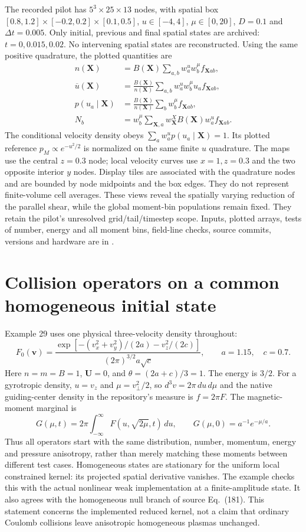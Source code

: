 \documentclass[11pt,letterpaper]{article}
\newcommand{\X}{\mathbf X}
\begin{document}
The recorded pilot has $5^3\times25\times13$ nodes, with spatial box
$[0.8,1.2]\times[-0.2,0.2]\times[0.1,0.5]$, $u\in[-4,4]$,
$\mu\in[0,20]$, $D=0.1$ and $\Delta t=0.005$. Only initial, previous and
final spatial states are archived: $t=0,0.015,0.02$. No intervening spatial
states are reconstructed. Using the same positive quadrature, the plotted
quantities are
\begin{align*}
 n(\X)&=B(\X)\sum_{a,b}w^u_a w^\mu_b f_{\X ab},\\
 \overline u(\X)&=\frac{B(\X)}{n(\X)}
        \sum_{a,b}w^u_a w^\mu_b u_a f_{\X ab},\\
 p(u_a\mid\X)&=\frac{B(\X)}{n(\X)}
        \sum_b w^\mu_b f_{\X ab},\\
 N_b&=w^\mu_b\sum_{\X,a}w^X_{\X}B(\X)w^u_a f_{\X ab}.
\end{align*}
The conditional velocity density obeys $\sum_a w^u_a p(u_a\mid\X)=1$.
Its plotted reference $p_M\propto e^{-u^2/2}$ is normalized on the same
finite $u$ quadrature. The maps use the central $z=0.3$ node; local velocity
curves use $x=1,z=0.3$ and the two opposite interior $y$ nodes. Display tiles
are associated with the quadrature nodes and are bounded by node midpoints
and the box edges. They do not represent finite-volume cell averages.
These views reveal the spatially varying reduction of the parallel shear,
while the global moment-bin populations remain fixed. They retain the
pilot's unresolved grid/tail/timestep scope. Inputs, plotted arrays, tests
of number, energy and all moment bins, field-line checks, source commits,
versions and hardware are in .

\section{Collision operators on a common homogeneous initial state}
\label{sec:commonoperators}
Example 29 uses one physical three-velocity density throughout:
\[
 F_0(\mathbf v)=\frac{\exp[-(v_x^2+v_y^2)/(2a)-v_z^2/(2c)]}
 {(2\pi)^{3/2}a\sqrt c},\qquad a=1.15,\quad c=0.7.
\]
Here $n=m=B=1$, $\mathbf U=0$, and $\theta=(2a+c)/3=1$.
The energy is $3/2$. For a gyrotropic density, $u=v_z$ and
$\mu=v_\perp^2/2$, so $d^3v=2\pi\,du\,d\mu$ and the native
guiding-center density in the repository's measure is $f=2\pi F$.
The magnetic-moment marginal is
\[
 G(\mu,t)=2\pi\int_{-\infty}^{\infty}F(u,\sqrt{2\mu},t)\,du,
 \qquad G(\mu,0)=a^{-1}e^{-\mu/a}.
\]
Thus all operators start with the same distribution, number, momentum,
energy and pressure anisotropy, rather than merely matching these moments
between different test cases. Homogeneous states are stationary for the
uniform local constrained kernel: its projected spatial derivative
vanishes. The example checks this with the actual nonlinear weak
implementation at a finite-amplitude state. It also agrees with the
homogeneous null branch of source Eq.~(181). This statement concerns the
implemented reduced kernel, not a claim that ordinary Coulomb collisions
leave anisotropic homogeneous plasmas unchanged.
\end{document}
